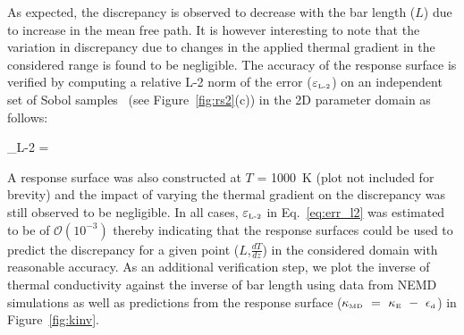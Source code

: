 As expected, the discrepancy is observed to decrease
 with the bar length ($L$) due to increase in the mean free path. It is however interesting to note that the 
 variation in discrepancy due to changes in the applied thermal gradient in the considered range is found to be
 negligible. The accuracy of the response surface is verified by computing a relative L-2 norm of the error
 ($\varepsilon_{\tiny{\mbox{L-2}}}$) on an independent set of Sobol samples~\cite{Saltelli:2010}
(see Figure~\ref{fig:rs2}(c)) in the 2D 
 parameter domain as follows:
 
 \be
 \varepsilon_{\tiny{\mbox{L-2}}} =  
 \label{eq:err_l2}
 \ee
 
 A response surface was also constructed at $T$ = 1000~K (plot not included for brevity) and the impact of
 varying the thermal gradient on the discrepancy was still observed to be negligible. In all cases,
 $\varepsilon_{\tiny{\mbox{L-2}}}$ in Eq.~\ref{eq:err_l2} was estimated to be of $\mathcal{O}(10^{-3})$ thereby
 indicating that the response surfaces could be used to predict the discrepancy for a given
 point ($L$,$\frac{dT}{dz}$) in the considered domain with reasonable accuracy. As an additional verification
 step, we plot the inverse of thermal conductivity against the inverse of bar length using data from NEMD
 simulations as well as predictions from the response surface 
($\kappa_{\mbox{\tiny{MD}}}~=~\kappa_{\mbox{\tiny{E}}}~-~\epsilon_{\mbox{\tiny{d}}}$) in Figure~\ref{fig:kinv}.

